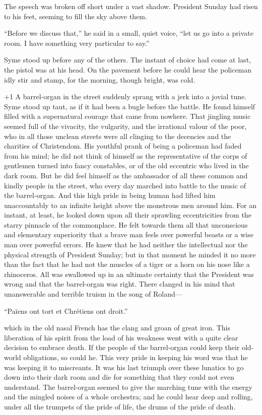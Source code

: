 The speech was broken off short under a vast shadow. President Sunday had risen to his feet, seeming to fill the sky above them.

“Before we discuss that,” he said in a small, quiet voice, “let us go into a private room. I have something very particular to say.”

Syme stood up before any of the others. The instant of choice had come at last, the pistol was at his head. On the pavement before he could hear the policeman idly stir and stamp, for the morning, though bright, was cold.

\looseness+1
A barrel-organ in the street suddenly sprang with a jerk into a jovial tune. Syme stood up taut, as if it had been a bugle before the battle. He found himself filled with a supernatural courage that came from nowhere. That jingling music seemed full of the vivacity, the vulgarity, and the irrational valour of the poor, who in all those unclean streets were all clinging to the decencies and the charities of Christendom. His youthful prank of being a policeman had faded from his mind; he did not think of himself as the representative of the corps of gentlemen turned into fancy constables, or of the old eccentric who lived in the dark room. But he did feel himself as the ambassador of all these common and kindly people in the street, who every day marched into battle to the music of the barrel-organ. And this high pride in being human had lifted him unaccountably to an infinite height above the monstrous men around him. For an instant, at least, he looked down upon all their sprawling eccentricities from the starry pinnacle of the commonplace. He felt towards them all that unconscious and elementary superiority that a brave man feels over powerful beasts or a wise man over powerful errors. He knew that he had neither the intellectual nor the physical strength of President Sunday; but in that moment he minded it no more than the fact that he had not the muscles of a tiger or a horn on his nose like a rhinoceros. All was swallowed up in an ultimate certainty that the President was wrong and that the barrel-organ was right. There clanged in his mind that unanswerable and terrible truism in the song of Roland⁠—

    “Païens ont tort et Chrétiens ont droit.”

which in the old nasal French has the clang and groan of great iron. This liberation of his spirit from the load of his weakness went with a quite clear decision to embrace death. If the people of the barrel-organ could keep their old-world obligations, so could he. This very pride in keeping his word was that he was keeping it to miscreants. It was his last triumph over these lunatics to go down into their dark room and die for something that they could not even understand. The barrel-organ seemed to give the marching tune with the energy and the mingled noises of a whole orchestra; and he could hear deep and rolling, under all the trumpets of the pride of life, the drums of the pride of death.

